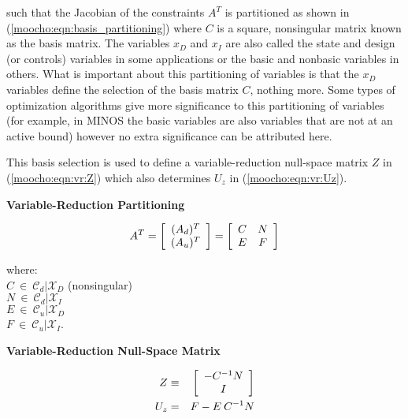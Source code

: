 \documentclass[pdf,ps2pdf,11pt]{SANDreport}
\begin{document}
{such that the Jacobian of the constraints $A^T$ is partitioned as
shown in (\ref{moocho:eqn:basis_partitioning}) where $C$ is a square,
nonsingular matrix known as the basis matrix.  The variables $x_D$ and
$x_I$ are also called the state and design (or controls) variables
\cite{GBiros_OGhattas_1999a} in some applications or the basic and
nonbasic variables \cite{ref:murtagh_minos_1995} in others.  What is
important about this partitioning of variables is that the $x_D$
variables define the selection of the basis matrix $C$, nothing more.
Some types of optimization algorithms give more significance to this
partitioning of variables (for example, in MINOS
\cite{ref:murtagh_minos_1995} the basic variables are also variables
that are not at an active bound) however no extra significance can be
attributed here.

This basis selection is
used to define a variable-reduction null-space matrix $Z$ in
(\ref{moocho:eqn:vr:Z}) which also determines $U_z$ in
(\ref{moocho:eqn:vr:Uz}).

{\bsinglespace
\begin{center}\textbf{Variable-Reduction Partitioning}\end{center}
\begin{equation}
A^T =
{\bmat{c}
(A_d)^T \\
(A_u)^T
\emat}
=
{\bmat{cc}
C & N \\
E & F
\emat}
\label{moocho:eqn:basis_partitioning}
\end{equation} 
\begin{tabbing}
\hspace{4ex}where:\hspace{5ex}\= \\
\>	$C \:\in\:\mathcal{C}_d|\mathcal{X}_D$ \hspace{4ex} (nonsingular)\\
\>	$N \:\in\:\mathcal{C}_d|\mathcal{X}_I$ \\
\>	$E \:\in\:\mathcal{C}_u|\mathcal{X}_D$ \\
\>	$F \:\in\:\mathcal{C}_u|\mathcal{X}_I$.
\end{tabbing}

\begin{center}\textbf{Variable-Reduction Null-Space Matrix}\end{center}
\begin{eqnarray}
Z & \equiv & {\bmat{c} - C^{-1} N \\ I \emat}       \label{moocho:eqn:vr:Z}  \\
U_z & = & F - E \: C^{-1} N                         \label{moocho:eqn:vr:Uz} 
\end{eqnarray}
\esinglespace}

}
\end{document}

